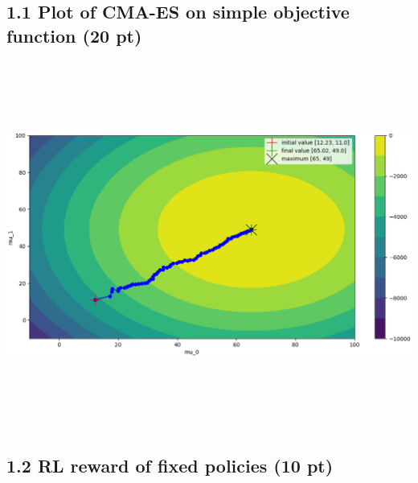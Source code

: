 \documentclass[12pt]{article}
\begin{document}
\subsection*{1.1 Plot of CMA-ES on simple objective function (20 pt)}
\begin{tcolorbox}[fit,height=30em, width=40em, blank, borderline={1pt}{1pt},nobeforeafter]
            \begin{center}
            \vspace*{0.4cm}\includegraphics[height= 12cm, width=15.5cm]{q1-1}
            \end{center}
            \end{tcolorbox}
            
\subsection*{1.2 RL reward of fixed policies (10 pt)}
\end{document}
